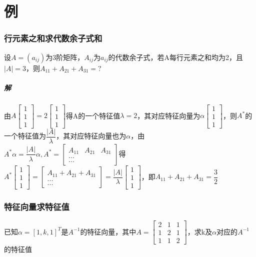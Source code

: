 \section{例}

\subsubsection{行元素之和求代数余子式和}
设\(A = (a_{ij})\)为3阶矩阵，\(A_{ij}\)为\(a_{ij}\)的代数余子式，若A每行元素之和均为2，且\(|A| = 3\)，则\(A_{11} + A_{21} + A_{31} = ?\)

\subparagraph{解}
由\(A\begin{bmatrix}
    1 \\ 
    1 \\ 
    1
\end{bmatrix} = 2\begin{bmatrix}
    1 \\ 
    1 \\ 
    1
\end{bmatrix}\)得A的一个特征值\(\lambda = 2\)，其对应特征向量为\(\alpha\begin{bmatrix}
    1 \\ 
    1 \\ 
    1
\end{bmatrix}\)，则\(A^*\)的一个特征值为\(\dfrac{|A|}{\lambda}\)，其对应特征向量也为\(\alpha\)，由\(A^*\alpha = \dfrac{|A|}{\lambda}\alpha, A^* = \begin{bmatrix}
    A_{11} & A_{21} & A_{31} \\
    ... \\
    ...
\end{bmatrix}\)得\(A^*\begin{bmatrix}
    1 \\ 
    1 \\ 
    1
\end{bmatrix} = \begin{bmatrix}
    A_{11} + A_{21} + A_{31} \\ 
    ... \\ 
    ...
\end{bmatrix} = \dfrac{|A|}{\lambda}\begin{bmatrix}
    1 \\ 
    1 \\ 
    1
\end{bmatrix}\)，即\(A_{11} + A_{21} + A_{31} = \dfrac{3}{2}\)

\subsubsection{特征向量求特征值}
已知\(\alpha = [1, k, 1]^T\)是\(A^{-1}\)的特征向量，其中\(A = \begin{bmatrix}
    2 & 1 & 1 \\ 
    1 & 2 & 1 \\ 
    1 & 1 & 2
\end{bmatrix}\)，求k及\(\alpha\)对应的\(A^{-1}\)的特征值

